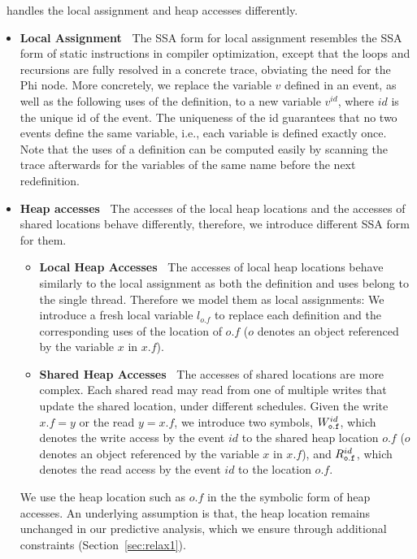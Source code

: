 \tool\ handles the local assignment and heap accesses differently.
\begin{itemize}
\item {\bf Local Assignment\ } The SSA form for local assignment resembles the SSA form of static instructions in compiler optimization, except that the loops and recursions are fully resolved in a concrete trace, obviating the need for the {\sf Phi} node. More concretely, we replace the variable $v$ defined in an event, as well as the following uses of the definition, to a new variable $v^{id}$, where $id$ is the unique id of the event. The uniqueness of the id guarantees that no two events define the same variable, i.e., each variable is defined exactly once. Note that the uses of a definition can be computed easily by scanning the trace afterwards for the variables of the same name before the next redefinition. 
\item {\bf Heap accesses\ } The accesses of the local heap locations and the accesses of shared locations behave differently, therefore, we introduce different SSA form for them. 
\begin{itemize}
\item {\bf Local Heap Accesses\ } The accesses of local heap locations behave similarly to the local assignment as both the definition and uses belong to the single thread. Therefore we model them as local assignments: We introduce a fresh local variable {\tt $l_{o.f }$} to replace each definition and  the corresponding uses of the location of $o.f$ ($o$ denotes an object referenced by the variable $x$ in $x.f$).  
\item  {\bf Shared Heap Accesses\ } The accesses of shared locations are more complex. Each shared read may read from one of multiple writes that update the shared location, under different schedules.     Given the write $x.f=y$ or the read $y=x.f$, we introduce two symbols, $W^{id}_{\tt o.f }$, which denotes the write access by the event $id$ to the  shared heap location  $o.f$  ($o$ denotes an object referenced by the variable $x$ in $x.f$), and $R^{id}_{\tt  o.f }$,  which denotes the read access  by the event $id$ to the location $o.f$. 
\end{itemize}
We use the heap location such as $o.f$ in the the symbolic form of heap accesses. An underlying assumption is that, the heap location remains unchanged in our predictive analysis, which we ensure through additional constraints (Section~\ref{sec:relax1}).
\end{itemize}


